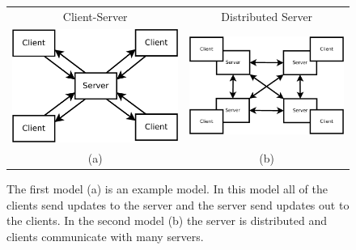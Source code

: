 	\begin{figure}[ht]
	\centering
	\begin{tabular}{c c}
		Client-Server & Distributed Server \\
		\includegraphics[width=0.44\linewidth]{../images/client-server-model-crop.pdf} &
		\includegraphics[width=0.48\linewidth]{../images/client-distributed-server-model-crop.pdf} \\
		(a) & (b)
	\end{tabular}

	\caption{\label{figure:server-models} The first model (a) is an example \clientServer model. In this model all of the clients send updates to the server and the server send updates out to the clients. In the second model (b) the server is distributed and clients communicate with many servers.}
	\end{figure}
	
